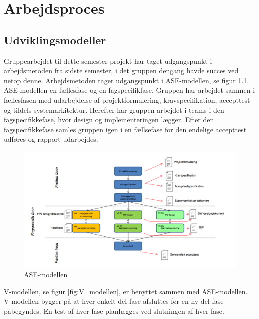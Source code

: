 
\chapter{Arbejdsproces}

\section{Udviklingsmodeller}
Gruppearbejdet til dette semester projekt har taget udgangspunkt i arbejdsmetoden fra sidste semester, i det gruppen dengang havde succes ved netop denne. Arbejdsmetoden tager udgangspunkt i ASE-modellen, se figur \ref{fig:ASE_modellen}. ASE-modellen en fællesfase og en fagspecifikfase. Gruppen har arbejdet sammen i fællesfasen med udarbejdelse af projektformulering, kravspecifikation, accepttest og tildels systemarkitektur. Herefter har gruppen arbejdet i teams i den fagspecifikkefase, hvor design og implementeringen lægger. Efter den fagspecifikkefase samles gruppen igen i en fællsefase for den endelige accepttest udføres og rapport udarbejdes. 

\begin{figure}[h]
  \centering
    \includegraphics[width=\textwidth]{Billeder/ASE_modellen}
    \caption{ASE-modellen}
    \label{fig:ASE_modellen}
\end{figure}

V-modellen, se figur \ref{fig:V_modellen}, er benyttet sammen med ASE-modellen. V-modellen bygger på at hver enkelt del fase afsluttes før en ny del fase påbegyndes. En test af hver fase planlægges ved slutningen af hver fase. 

